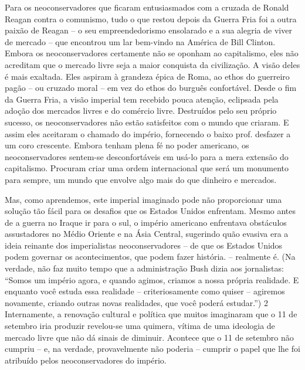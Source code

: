 \par
 
Para os neoconservadores que ficaram entusiasmados com a cruzada de Ronald Reagan contra o comunismo, tudo o que restou depois da Guerra Fria foi a outra paixão de Reagan – o seu empreendedorismo ensolarado e a sua alegria de viver de mercado – que encontrou um lar bem-vindo na América de Bill Clinton. Embora os neoconservadores certamente não se oponham ao capitalismo, eles não acreditam que o mercado livre seja a maior conquista da civilização. A visão deles é mais exaltada. Eles aspiram à grandeza épica de Roma, ao ethos do guerreiro pagão – ou cruzado moral – em vez do ethos do burguês confortável. Desde o fim da Guerra Fria, a visão imperial tem recebido pouca atenção, eclipsada pela adoção dos mercados livres e do comércio livre. Destruídos pelo seu próprio sucesso, os neoconservadores não estão satisfeitos com o mundo que criaram. E assim eles aceitaram o chamado do império, fornecendo o baixo prof. desfazer a um coro crescente. Embora tenham plena fé no poder americano, os neoconservadores sentem-se desconfortáveis ​​em usá-lo para a mera extensão do capitalismo. Procuram criar uma ordem internacional que será um monumento para sempre, um mundo que envolve algo mais do que dinheiro e mercados.
 
\par
 
Mas, como aprendemos, este imperial imaginado pode não proporcionar uma solução tão fácil para os desafios que os Estados Unidos enfrentam. Mesmo antes de a guerra no Iraque ir para o sul, o império americano enfrentava obstáculos assustadores no Médio Oriente e na Ásia Central, sugerindo quão evasiva era a ideia reinante dos imperialistas neoconservadores – de que os Estados Unidos podem governar os acontecimentos, que podem fazer história. – realmente é. (Na verdade, não faz muito tempo que a administração Bush dizia aos jornalistas: “Somos um império agora, e quando agimos, criamos a nossa própria realidade. E enquanto você estuda essa realidade – criteriosamente como quiser – agiremos novamente, criando outras novas realidades, que você poderá estudar.”)
 {\color{blue} 2}  
Internamente, a renovação cultural e política que muitos imaginaram que o 11 de setembro iria produzir revelou-se uma quimera, vítima de uma ideologia de mercado livre que não dá sinais de diminuir. Acontece que o 11 de setembro não cumpriu – e, na verdade, provavelmente não poderia – cumprir o papel que lhe foi atribuído pelos neoconservadores do império.
 
